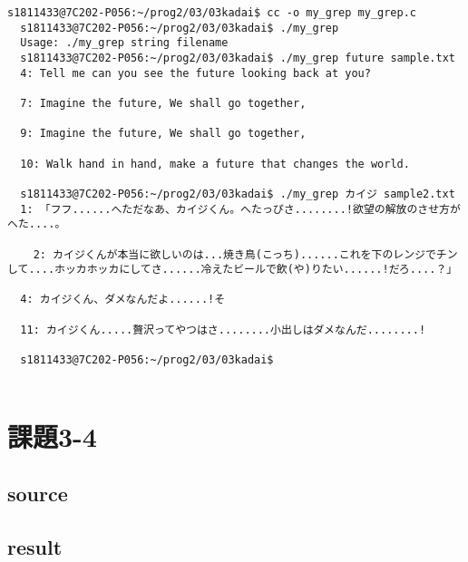\documentclass[10pt,a4paper]{jsarticle}
\begin{document}
\begin{lstlisting}[basicstyle=\ttfamily\footnotesize,frame=single]
  s1811433@7C202-P056:~/prog2/03/03kadai$ cc -o my_grep my_grep.c
  s1811433@7C202-P056:~/prog2/03/03kadai$ ./my_grep
  Usage: ./my_grep string filename
  s1811433@7C202-P056:~/prog2/03/03kadai$ ./my_grep future sample.txt
  4: Tell me can you see the future looking back at you?

  7: Imagine the future, We shall go together,

  9: Imagine the future, We shall go together,

  10: Walk hand in hand, make a future that changes the world.

  s1811433@7C202-P056:~/prog2/03/03kadai$ ./my_grep カイジ sample2.txt
  1: 「フフ......へただなあ、カイジくん。へたっぴさ........!欲望の解放のさせ方がへた....。

    2: カイジくんが本当に欲しいのは...焼き鳥(こっち)......これを下のレンジでチンして....ホッカホッカにしてさ......冷えたビールで飲(や)りたい......!だろ....？」

  4: カイジくん、ダメなんだよ......!そ

  11: カイジくん.....贅沢ってやつはさ........小出しはダメなんだ........!

  s1811433@7C202-P056:~/prog2/03/03kadai$ 
 
\end{lstlisting}

\section{課題3-4}
\subsection{source}


\subsection{result}
\end{document}
